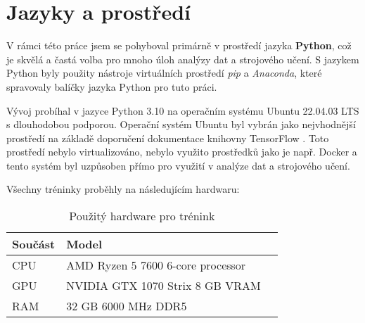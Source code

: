 \section{Jazyky a prostředí}
\label{sec:Chapter51}
V rámci této práce jsem se pohyboval primárně v prostředí jazyka \textbf{Python}, což je skvělá a častá volba pro mnoho úloh analýzy dat a strojového učení. S jazykem Python byly použity nástroje virtuálních prostředí \textit{pip} a \textit{Anaconda}, které spravovaly balíčky jazyka Python pro tuto práci.

Vývoj probíhal v jazyce Python 3.10 na operačním systému Ubuntu 22.04.03 LTS s dlouhodobou podporou. Operační systém Ubuntu byl vybrán jako nejvhodnější prostředí na základě doporučení dokumentace knihovny TensorFlow \cite{tensorflow_install}. Toto prostředí nebylo virtualizováno, nebylo využito prostředků jako je např. Docker a tento systém byl uzpůsoben přímo pro využití v analýze dat a strojového učení.

Všechny tréninky proběhly na následujícím hardwaru:

\begin{table}[ht]
\centering
\begin{tabular}{@{}lll@{}}
\toprule
Součást & Model \\
\midrule
CPU & AMD Ryzen 5 7600 6-core processor \\
GPU & NVIDIA GTX 1070 Strix 8 GB VRAM  \\
RAM & 32 GB 6000 MHz DDR5 \\
\bottomrule
\end{tabular}
\caption{Použitý hardware pro trénink}
\label{fig:wortelus_pc}
\end{table}

